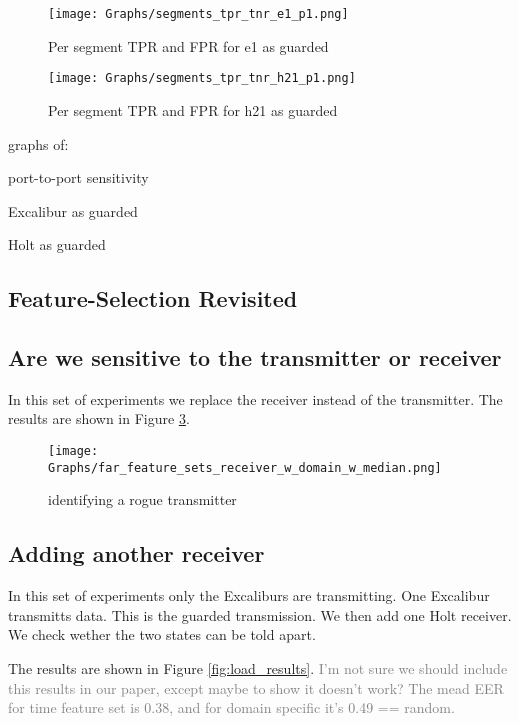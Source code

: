 \documentclass[conference]{IEEEtran}
\begin{document}
  \begin{figure}[t]
    \centering
    \texttt{[image: Graphs/segments\_tpr\_tnr\_e1\_p1.png]}
    \caption{Per segment TPR and FPR for e1 as guarded}
    \label{fig:segments_easy_example}
  \end{figure}
  
  \begin{figure}[t]
    \centering
    \texttt{[image: Graphs/segments\_tpr\_tnr\_h21\_p1.png]}
    \caption{Per segment TPR and FPR for h21 as guarded}
    \label{fig:segments_difficult_example}
  \end{figure}
  
  \color{gray}
    graphs of:

    port-to-port sensitivity

    Excalibur as guarded
 
    Holt as guarded
   \color{black}
 
\subsection{Feature-Selection Revisited}

\subsection{Are we sensitive to the transmitter or receiver}
  In this set of experiments we replace the receiver instead of the transmitter. The results are shown in Figure \ref{fig:receiver_results}.
  
  \begin{figure}[t]
    \centering
    \texttt{[image: Graphs/far\_feature\_sets\_receiver\_w\_domain\_w\_median.png]}
    \caption{identifying a rogue transmitter}
    \label{fig:receiver_results}
  \end{figure}
  
\subsection{Adding another receiver}
  In this set of experiments only the Excaliburs are transmitting. One Excalibur transmitts data. This is the guarded transmission. We then add one Holt receiver. We check wether the two states can be told apart.
  
  The results are shown in Figure \ref{fig:load_results}. \textcolor{gray}{I'm not sure we should include this results in our paper, except maybe to show it doesn't work? The mead EER for time feature set is 0.38, and for domain specific it's 0.49 == random.}
  
\end{document}
